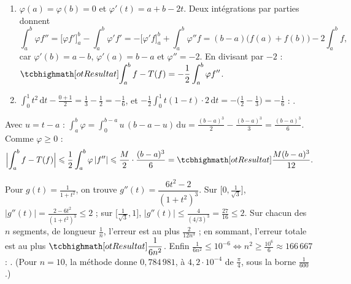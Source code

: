 
\enParties

\begin{corrigeEval}{}{}
\begin{questions}
  \item \begin{enumerate}[label=\alph*)]
      \item $\varphi(a)=\varphi(b)=0$ et $\varphi'(t)=a+b-2t$. Deux
        intégrations par parties donnent
        \[\int_a^{b}\varphi f''=\bigl[\varphi f'\bigr]_a^{b}-\int_a^{b}\varphi'f'
          =-\bigl[\varphi'f\bigr]_a^{b}+\int_a^{b}\varphi''f
          =(b-a)\bigl(f(a)+f(b)\bigr)-2\int_a^{b}f,\]
        car $\varphi'(b)=a-b$, $\varphi'(a)=b-a$ et $\varphi''=-2$. En
        divisant par $-2$ : $\res{\displaystyle\int_a^{b}f-T(f)=-\frac12\int_a^{b}\varphi f''}$.
      \item $\int_0^{1}t^{2}\,\mathrm{d}t-\frac{0+1}{2}=\frac13-\frac12=-\frac16$,
        et $-\frac12\int_0^{1}t(1-t)\cdot2\,\mathrm{d}t=-\bigl(\frac12-\frac13\bigr)=-\frac16$ :
        .
    \end{enumerate}
  \item Avec $u=t-a$ :
    $\int_a^{b}\varphi=\int_0^{b-a}u\,(b-a-u)\,\mathrm{d}u=\frac{(b-a)^{3}}{2}-\frac{(b-a)^{3}}{3}=\frac{(b-a)^{3}}{6}$.
    Comme $\varphi\geqslant0$ :
    \[\Bigl|\int_a^{b}f-T(f)\Bigr|\leqslant\frac12\int_a^{b}\varphi\,|f''|
      \leqslant\frac M2\cdot\frac{(b-a)^{3}}{6}=\res{\frac{M(b-a)^{3}}{12}}.\]
  \item Pour $g(t)=\frac{1}{1+t^{2}}$, on trouve
    $g''(t)=\dfrac{6t^{2}-2}{(1+t^{2})^{3}}$. Sur $\bigl[0,\frac{1}{\sqrt3}\bigr]$,
    $|g''(t)|=\frac{2-6t^{2}}{(1+t^{2})^{3}}\leqslant2$ ; sur
    $\bigl[\frac1{\sqrt3},1\bigr]$,
    $|g''(t)|\leqslant\frac{4}{(4/3)^{3}}=\frac{27}{16}\leqslant2$. Sur chacun
    des $n$ segments, de longueur $\frac1n$, l'erreur est au plus
    $\frac{2}{12n^{3}}$ ; en sommant, l'erreur totale est au plus
    $\res{\dfrac{1}{6n^{2}}}$. Enfin
    $\frac{1}{6n^{2}}\leqslant10^{-6}\iff n^{2}\geqslant\frac{10^{6}}{6}\approx166\,667$ :
    . (Pour $n=10$, la méthode donne
    $0{,}784\,981$, à $4{,}2\cdot10^{-4}$ de $\frac\pi4$, sous la borne
    $\frac1{600}$.)
\end{questions}
\end{corrigeEval}

